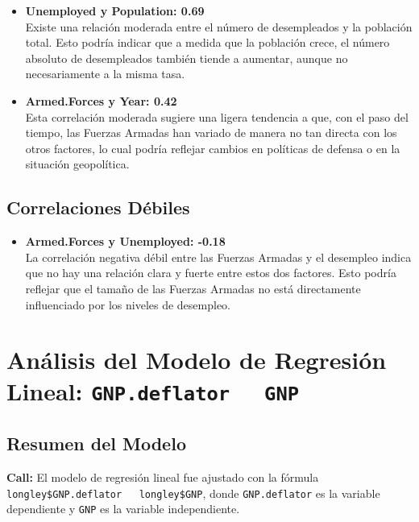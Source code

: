 \documentclass{article}
\begin{document}
    \begin{itemize}
        \item \textbf{Unemployed y Population: 0.69} \\
        Existe una relación moderada entre el número de desempleados y la población total. Esto podría indicar que a medida que la población crece, el número absoluto de desempleados también tiende a aumentar, aunque no necesariamente a la misma tasa.
        
        \item \textbf{Armed.Forces y Year: 0.42} \\
        Esta correlación moderada sugiere una ligera tendencia a que, con el paso del tiempo, las Fuerzas Armadas han variado de manera no tan directa con los otros factores, lo cual podría reflejar cambios en políticas de defensa o en la situación geopolítica.
    \end{itemize}
    
    \subsection{Correlaciones Débiles}
    
    \begin{itemize}
        \item \textbf{Armed.Forces y Unemployed: -0.18} \\
        La correlación negativa débil entre las Fuerzas Armadas y el desempleo indica que no hay una relación clara y fuerte entre estos dos factores. Esto podría reflejar que el tamaño de las Fuerzas Armadas no está directamente influenciado por los niveles de desempleo.
    \end{itemize}

    \section*{Análisis del Modelo de Regresión Lineal: \texttt{GNP.deflator ~ GNP}}

\subsection*{Resumen del Modelo}

\textbf{Call:}  
El modelo de regresión lineal fue ajustado con la fórmula \texttt{longley\$GNP.deflator ~ longley\$GNP}, donde \texttt{GNP.deflator} es la variable dependiente y \texttt{GNP} es la variable independiente.
\end{document}
